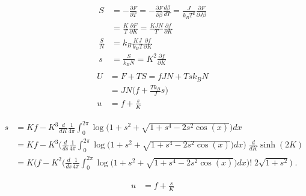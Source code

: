 %
\begin{align*}
S &= -\frac{\partial F}{\partial T} = -\frac{\partial F}{\partial \beta} \frac{d\beta}{dT}
= \frac{J}{k_{B}T^{2}} \frac{\partial F}{\partial J \beta} \\
&= \frac{K}{T} \frac{\partial F}{\partial K} = \frac{K J N}{T} \frac{\partial f}{\partial K}\\
\frac{S}{N}&= k_{B}\frac{K J}{k_{B}T} \frac{\partial f}{\partial K}\\
s&=\frac{S}{k_{B}N}= K^{2} \frac{\partial f}{\partial K}\\
\end{align*}
%
%
\begin{align*}
U &= F+TS = f J N + T s k_{B} N  \\
&= JN\bigg( f  + \frac{T  k_{B}}{J} s\bigg) \\
u&= f + \frac{s}{K}
\end{align*}
%

%
\begin{align*}
s&= K f - K^{3}\frac{d}{dK} \frac{1}{4\pi}\int_{0}^{2\pi}
\log\bigg( 1+s^{2} +  \sqrt{1+s^{4} -2 s^{2}\cos(x)}\bigg) dx\\
&= K f - K^{3}\bigg(\frac{d}{ds} \frac{1}{4\pi}\int_{0}^{2\pi}
\log\bigg( 1+s^{2} +  \sqrt{1+s^{4} -2 s^{2}\cos(x)}\bigg) dx\bigg)
\;\frac{d}{dK} \sinh(2K)\\
&= K \bigg(f - K^{2}\bigg(\frac{d}{ds} \frac{1}{4\pi}\int_{0}^{2\pi}
\log\bigg( 1+s^{2} +  \sqrt{1+s^{4} -2 s^{2}\cos(x)}\bigg) dx\bigg)!
\;2 \sqrt{1+s^{2}}\bigg)\;.
\end{align*}
%

%
\begin{align*}
u &= f + \frac{s}{K}
\end{align*}
%





